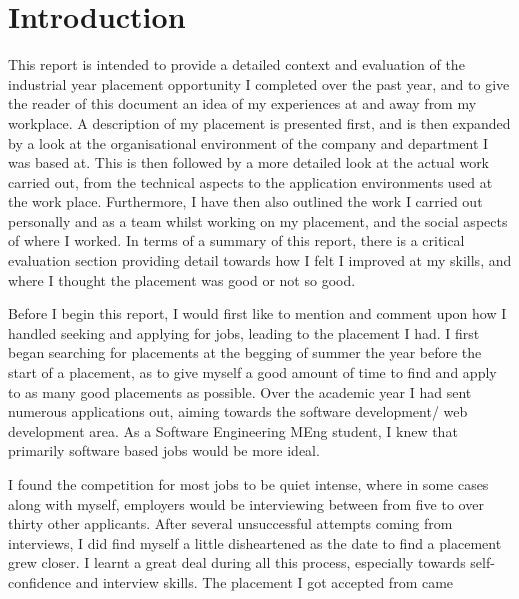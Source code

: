 \documentclass[12pt]{article}
\begin{document}
\newpage


\section{Introduction}
This report is intended to provide a detailed context and evaluation of the industrial year placement opportunity I
completed over the past year, and to give the reader of this document an idea of my experiences at and away from my
workplace. A description of my placement is presented first, and is then expanded by a look at the organisational
environment of the company and department I was based at. This is then followed by a more detailed look at the actual
work carried out, from the technical aspects to the application environments used at the work place. Furthermore, I have
then also outlined the work I carried out personally and as a team whilst working on my placement, and the social
aspects of where I worked. In terms of a summary of this report, there is a critical evaluation section providing detail
towards how I felt I improved at my skills, and where I thought the placement was good or not so good.\\ \par \noindent
Before I begin this report, I would first like to mention and comment upon how I handled seeking and applying for jobs,
leading to the placement I had. I first began searching for placements at the begging of summer the year before the
start of a placement, as to give myself a good amount of time to find and apply to as many good placements as possible.
Over the academic year I had sent numerous applications out, aiming towards the software development/ web development
area. As a Software Engineering MEng student, I knew that primarily software based jobs would be more ideal.\\ \par \noindent
I found the competition for most jobs to be quiet intense, where in some cases along with myself, employers would be
interviewing between from five to over thirty other applicants. After several unsuccessful attempts coming from
interviews, I did find myself a little disheartened as the date to find a placement grew closer. I learnt a great deal
during all this process, especially towards self-confidence and interview skills. The placement I got accepted from came
\end{document}
